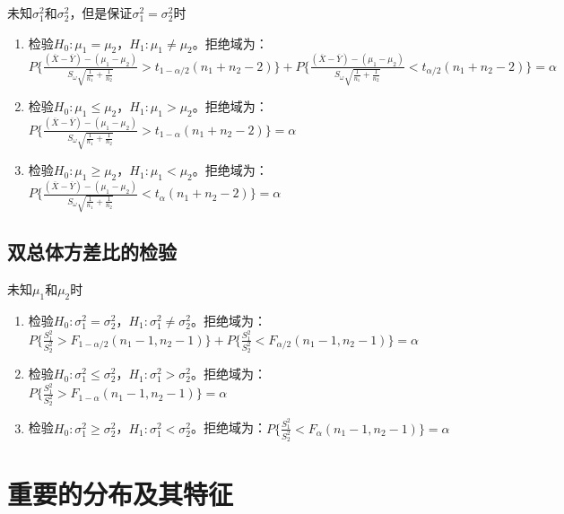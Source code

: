 \documentclass[a4paper,12pt]{ctexart}
\begin{document}
未知$\sigma_1^2$和$\sigma_2^2$，但是保证$\sigma_1^2 = \sigma_2^2$时
\begin{enumerate}
	\item 检验$H_0: \mu_1 = \mu_2$，$H_1: \mu_1 \neq \mu_2$。拒绝域为：$P\{\frac{(\overline{X} - \overline{Y}) - (\mu_1 - \mu_2)}{S_{\omega}\sqrt{\frac{1}{n_1} + \frac{1}{n_2}}} > t_{1-\alpha/2}(n_1 + n_2 - 2)\} + P\{\frac{(\overline{X} - \overline{Y}) - (\mu_1 - \mu_2)}{S_{\omega}\sqrt{\frac{1}{n_1} + \frac{1}{n_2}}} < t_{\alpha/2}(n_1 + n_2 - 2)\} = \alpha$
	\item 检验$H_0: \mu_1 \leq \mu_2$，$H_1: \mu_1 > \mu_2$。拒绝域为：$P\{\frac{(\overline{X} - \overline{Y}) - (\mu_1 - \mu_2)}{S_{\omega}\sqrt{\frac{1}{n_1} + \frac{1}{n_2}}} > t_{1-\alpha}(n_1 + n_2 - 2)\} = \alpha$
	\item 检验$H_0: \mu_1 \geq \mu_2$，$H_1: \mu_1 < \mu_2$。拒绝域为：$P\{\frac{(\overline{X} - \overline{Y}) - (\mu_1 - \mu_2)}{S_{\omega}\sqrt{\frac{1}{n_1} + \frac{1}{n_2}}} < t_{\alpha}(n_1 + n_2 - 2)\} = \alpha$
\end{enumerate}

\subsection{双总体方差比的检验}

未知$\mu_1$和$\mu_2$时
\begin{enumerate}
	\item 检验$H_0: \sigma_1^2 = \sigma_2^2$，$H_1: \sigma_1^2 \neq \sigma_2^2$。拒绝域为：$P\{\frac{S_1^2}{S_2^2} > F_{1-\alpha/2}(n_1 - 1,n_2 - 1)\} + P\{\frac{S_1^2}{S_2^2} < F_{\alpha/2}(n_1 - 1,n_2 - 1)\} = \alpha$
	\item 检验$H_0: \sigma_1^2 \leq \sigma_2^2$，$H_1: \sigma_1^2 > \sigma_2^2$。拒绝域为：$P\{\frac{S_1^2}{S_2^2} > F_{1-\alpha}(n_1 - 1,n_2 - 1)\} = \alpha$
	\item 检验$H_0: \sigma_1^2 \geq \sigma_2^2$，$H_1: \sigma_1^2 < \sigma_2^2$。拒绝域为：$P\{\frac{S_1^2}{S_2^2} < F_{\alpha}(n_1 - 1,n_2 - 1)\} = \alpha$
\end{enumerate}

\section{重要的分布及其特征}
\end{document}
